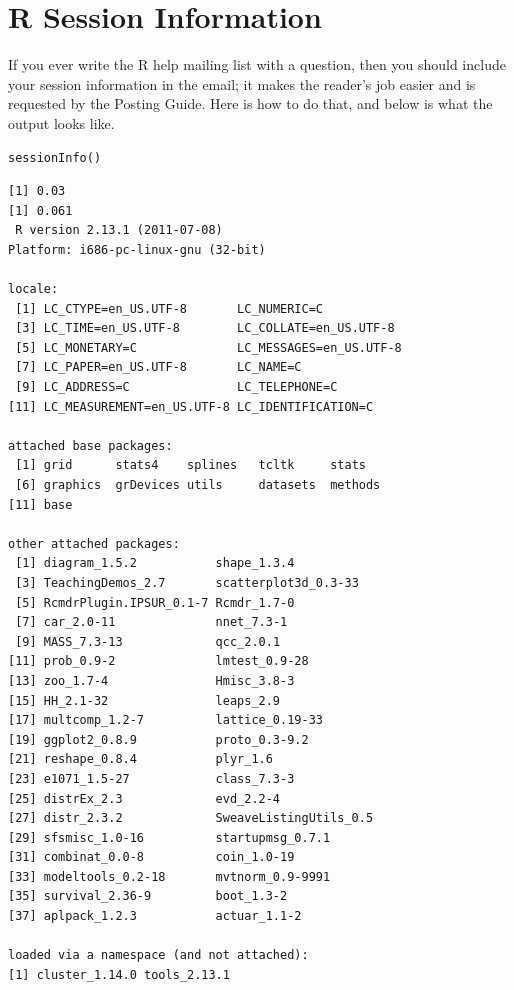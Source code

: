 \documentclass[captions=tableheading]{scrbook}
\begin{document}
\appendix
\chapter{\textsf{R} Session Information}
\label{sec-17}

\label{cha:R-Session-Information}

If you ever write the \textsf{R} help mailing list with a question, then you should include your session information in the email; it makes the reader's job easier and is requested by the Posting Guide. Here is how to do that, and below is what the output looks like.


\begin{verbatim}
sessionInfo()
\end{verbatim}


\begin{verbatim}
[1] 0.03
[1] 0.061
 R version 2.13.1 (2011-07-08)
Platform: i686-pc-linux-gnu (32-bit)

locale:
 [1] LC_CTYPE=en_US.UTF-8       LC_NUMERIC=C              
 [3] LC_TIME=en_US.UTF-8        LC_COLLATE=en_US.UTF-8    
 [5] LC_MONETARY=C              LC_MESSAGES=en_US.UTF-8   
 [7] LC_PAPER=en_US.UTF-8       LC_NAME=C                 
 [9] LC_ADDRESS=C               LC_TELEPHONE=C            
[11] LC_MEASUREMENT=en_US.UTF-8 LC_IDENTIFICATION=C       

attached base packages:
 [1] grid      stats4    splines   tcltk     stats    
 [6] graphics  grDevices utils     datasets  methods  
[11] base     

other attached packages:
 [1] diagram_1.5.2           shape_1.3.4            
 [3] TeachingDemos_2.7       scatterplot3d_0.3-33   
 [5] RcmdrPlugin.IPSUR_0.1-7 Rcmdr_1.7-0            
 [7] car_2.0-11              nnet_7.3-1             
 [9] MASS_7.3-13             qcc_2.0.1              
[11] prob_0.9-2              lmtest_0.9-28          
[13] zoo_1.7-4               Hmisc_3.8-3            
[15] HH_2.1-32               leaps_2.9              
[17] multcomp_1.2-7          lattice_0.19-33        
[19] ggplot2_0.8.9           proto_0.3-9.2          
[21] reshape_0.8.4           plyr_1.6               
[23] e1071_1.5-27            class_7.3-3            
[25] distrEx_2.3             evd_2.2-4              
[27] distr_2.3.2             SweaveListingUtils_0.5 
[29] sfsmisc_1.0-16          startupmsg_0.7.1       
[31] combinat_0.0-8          coin_1.0-19            
[33] modeltools_0.2-18       mvtnorm_0.9-9991       
[35] survival_2.36-9         boot_1.3-2             
[37] aplpack_1.2.3           actuar_1.1-2           

loaded via a namespace (and not attached):
[1] cluster_1.14.0 tools_2.13.1
\end{verbatim}
\end{document}
